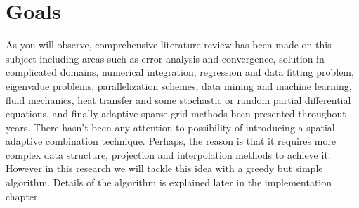 \section{Goals}
As you will observe, comprehensive literature review has been made on this subject including areas such as error analysis and convergence, solution in complicated domains, numerical integration, regression and data fitting problem, eigenvalue problems, parallelization schemes, data mining and machine learning, fluid mechanics, heat transfer and some stochastic or random partial differential equations, and finally adaptive sparse grid methods been presented throughout years. There hasn't been any attention to possibility of introducing a spatial adaptive combination technique. Perhaps, the reason is that it requires more complex data structure, projection and interpolation methods to achieve it. However in this research we will tackle this idea with a greedy but simple algorithm. Details of the algorithm is explained later in the implementation chapter.